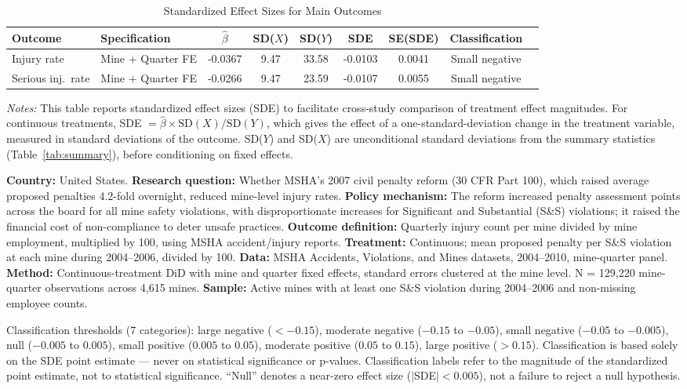 \begin{table}[H]
\centering
\caption{Standardized Effect Sizes for Main Outcomes}
\label{tab:sde}
\begin{adjustbox}{max width=\textwidth}
\small
\begin{tabular}{llccccccc}
\toprule
Outcome & Specification & $\hat{\beta}$ & SD($X$) & SD($Y$) & SDE & SE(SDE) & Classification \\
\midrule
Injury rate & Mine + Quarter FE & -0.0367 & 9.47 & 33.58 & -0.0103 & 0.0041 & Small negative \\
Serious inj.\ rate & Mine + Quarter FE & -0.0266 & 9.47 & 23.59 & -0.0107 & 0.0055 & Small negative \\
\bottomrule
\end{tabular}
\end{adjustbox}
\par\vspace{0.3em}
{\footnotesize \emph{Notes:} This table reports standardized effect sizes (SDE) to facilitate cross-study comparison of treatment effect magnitudes.
For continuous treatments, SDE $= \hat{\beta} \times \text{SD}(X) / \text{SD}(Y)$, which gives the effect of a one-standard-deviation change in the treatment variable, measured in standard deviations of the outcome.
SD($Y$) and SD($X$) are unconditional standard deviations from the summary statistics (Table~\ref{tab:summary}), before conditioning on fixed effects.

\textbf{Country:} United States.
\textbf{Research question:} Whether MSHA's 2007 civil penalty reform (30 CFR Part 100), which raised average proposed penalties 4.2-fold overnight, reduced mine-level injury rates.
\textbf{Policy mechanism:} The reform increased penalty assessment points across the board for all mine safety violations, with disproportionate increases for Significant and Substantial (S\&S) violations; it raised the financial cost of non-compliance to deter unsafe practices.
\textbf{Outcome definition:} Quarterly injury count per mine divided by mine employment, multiplied by 100, using MSHA accident/injury reports.
\textbf{Treatment:} Continuous; mean proposed penalty per S\&S violation at each mine during 2004--2006, divided by 100.
\textbf{Data:} MSHA Accidents, Violations, and Mines datasets, 2004--2010, mine-quarter panel.
\textbf{Method:} Continuous-treatment DiD with mine and quarter fixed effects, standard errors clustered at the mine level. N = 129,220 mine-quarter observations across 4,615 mines.
\textbf{Sample:} Active mines with at least one S\&S violation during 2004--2006 and non-missing employee counts.

Classification thresholds (7 categories): large negative ($< -0.15$), moderate negative ($-0.15$ to $-0.05$), small negative ($-0.05$ to $-0.005$), null ($-0.005$ to $0.005$), small positive ($0.005$ to $0.05$), moderate positive ($0.05$ to $0.15$), large positive ($> 0.15$).
Classification is based solely on the SDE point estimate --- never on statistical significance or p-values.
Classification labels refer to the magnitude of the standardized point estimate, not to statistical significance. ``Null'' denotes a near-zero effect size ($|$SDE$| < 0.005$), not a failure to reject a null hypothesis.}
\end{table}
